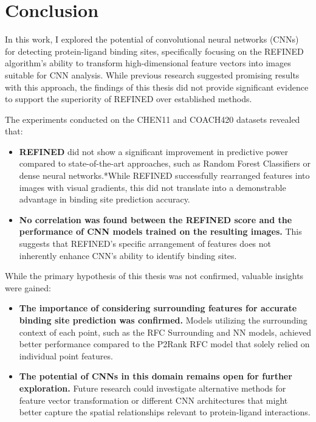 \chapter*{Conclusion}
In this work, I explored the potential of convolutional neural networks (CNNs) for detecting protein-ligand binding sites, specifically focusing on the REFINED algorithm's ability to transform high-dimensional feature vectors into images suitable for CNN analysis. While previous research suggested promising results with this approach, the findings of this thesis did not provide significant evidence to support the superiority of REFINED over established methods.

The experiments conducted on the CHEN11 and COACH420 datasets revealed that:
\begin{itemize}
    \item \textbf{REFINED} did not show a significant improvement in predictive power compared to state-of-the-art approaches, such as Random Forest Classifiers or dense neural networks.*While REFINED successfully rearranged features into images with visual gradients, this did not translate into a demonstrable advantage in binding site prediction accuracy.
    \item \textbf{No correlation was found between the REFINED score and the performance of CNN models trained on the resulting images.} This suggests that REFINED's specific arrangement of features does not inherently enhance CNN's ability to identify binding sites.

\end{itemize}

While the primary hypothesis of this thesis was not confirmed, valuable insights were gained:
\begin{itemize}
    \item \textbf{The importance of considering surrounding features for accurate binding site prediction was confirmed.} Models utilizing the surrounding context of each point, such as the RFC Surrounding and NN models, achieved better performance compared to the P2Rank RFC model that solely relied on individual point features.
    \item \textbf{The potential of CNNs in this domain remains open for further exploration.} Future research could investigate alternative methods for feature vector transformation or different CNN architectures that might better capture the spatial relationships relevant to protein-ligand interactions. 

\end{itemize}

